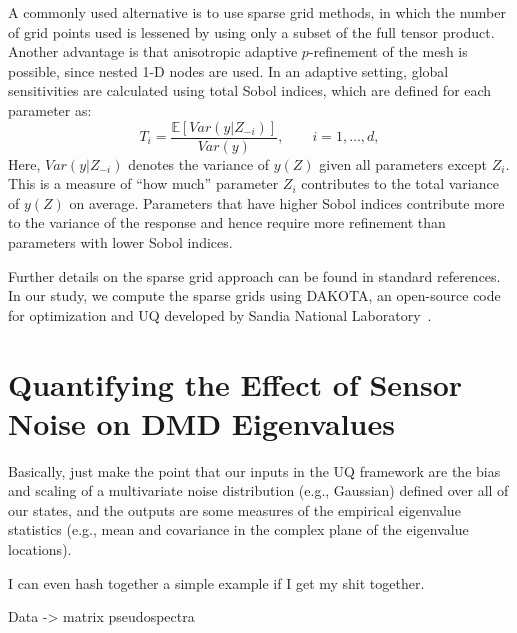 \documentclass{aiaa-tc}%
\begin{document}
A commonly used alternative is to use sparse grid methods\cite{Smolyak}, in
which the number of grid points used is lessened by using only a subset of the
full tensor product.
%
Another advantage is that anisotropic
adaptive $p$-refinement of the mesh is possible, since nested 1-D
nodes are used. In an adaptive setting, global sensitivities are
calculated using total Sobol indices, which are defined for each
parameter as:
\begin{equation}
T_i = \frac{\mathbb{E} [ Var(y|Z_{-i}) ]}{Var(y)},\qquad i = 1,\ldots,d,
\label{eq:sobol}
\end{equation}
Here,
$Var(y|Z_{-i})$ denotes the variance of $y(Z)$ given all parameters
except $Z_i$. This is a measure of ``how much'' parameter $Z_i$
contributes to the total variance of $y(Z)$ on average. Parameters
that have higher Sobol indices contribute more to the variance of the
response and hence require more refinement than parameters with lower
Sobol indices.

Further details on the sparse grid approach can be found in standard
references\cite{lemaitre,Gerstner:SparseGrids}. In our study, we compute the
sparse grids using DAKOTA, an
open-source code for optimization and UQ developed by Sandia National
Laboratory~\cite{Dakota}.

\section{Quantifying the Effect of Sensor Noise on DMD Eigenvalues}

Basically, just make the point that our inputs in the UQ framework are
the bias and scaling of a multivariate noise distribution (e.g.,
Gaussian) defined over all of our states, and the outputs are some
measures of the empirical eigenvalue statistics (e.g., mean and
covariance in the complex plane of the eigenvalue locations).

I can even hash together a simple example if I get my shit together.


Data -> matrix pseudospectra
\end{document}
